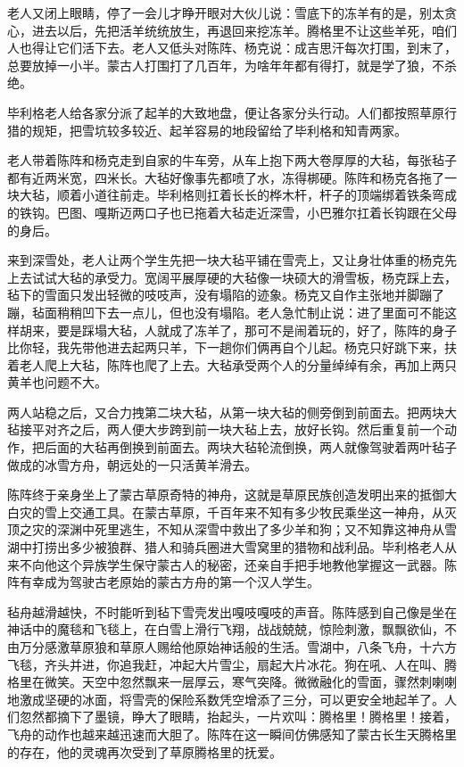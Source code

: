 \par 老人又闭上眼睛，停了一会儿才睁开眼对大伙儿说：雪底下的冻羊有的是，别太贪心，进去以后，先把活羊统统放生，再退回来挖冻羊。腾格里不让这些羊死，咱们人也得让它们活下去。老人又低头对陈阵、杨克说：成吉思汗每次打围，到末了，总要放掉一小半。蒙古人打围打了几百年，为啥年年都有得打，就是学了狼，不杀绝。
\par 毕利格老人给各家分派了起羊的大致地盘，便让各家分头行动。人们都按照草原行猎的规矩，把雪坑较多较近、起羊容易的地段留给了毕利格和知青两家。
\par 老人带着陈阵和杨克走到自家的牛车旁，从车上抱下两大卷厚厚的大毡，每张毡子都有近两米宽，四米长。大毡好像事先都喷了水，冻得梆硬。陈阵和杨克各拖了一块大毡，顺着小道往前走。毕利格则扛着长长的桦木杆，杆子的顶端绑着铁条弯成的铁钩。巴图、嘎斯迈两口子也已拖着大毡走近深雪，小巴雅尔扛着长钩跟在父母的身后。
\par 来到深雪处，老人让两个学生先把一块大毡平铺在雪壳上，又让身壮体重的杨克先上去试试大毡的承受力。宽阔平展厚硬的大毡像一块硕大的滑雪板，杨克踩上去，毡下的雪面只发出轻微的吱吱声，没有塌陷的迹象。杨克又自作主张地并脚蹦了蹦，毡面稍稍凹下去一点儿，但也没有塌陷。老人急忙制止说：进了里面可不能这样胡来，要是踩塌大毡，人就成了冻羊了，那可不是闹着玩的，好了，陈阵的身子比你轻，我先带他进去起两只羊，下一趟你们俩再自个儿起。杨克只好跳下来，扶着老人爬上大毡，陈阵也爬了上去。大毡承受两个人的分量绰绰有余，再加上两只黄羊也问题不大。
\par 两人站稳之后，又合力拽第二块大毡，从第一块大毡的侧旁倒到前面去。把两块大毡接平对齐之后，两人便大步跨到前一块大毡上去，放好长钩。然后重复前一个动作，把后面的大毡再倒换到前面去。两块大毡轮流倒换，两人就像驾驶着两叶毡子做成的冰雪方舟，朝远处的一只活黄羊滑去。
\par 陈阵终于亲身坐上了蒙古草原奇特的神舟，这就是草原民族创造发明出来的抵御大白灾的雪上交通工具。在蒙古草原，千百年来不知有多少牧民乘坐这一神舟，从灭顶之灾的深渊中死里逃生，不知从深雪中救出了多少羊和狗；又不知靠这神舟从雪湖中打捞出多少被狼群、猎人和骑兵圈进大雪窝里的猎物和战利品。毕利格老人从来不向他这个异族学生保守蒙古人的秘密，还亲自手把手地教他掌握这一武器。陈阵有幸成为驾驶古老原始的蒙古方舟的第一个汉人学生。
\par 毡舟越滑越快，不时能听到毡下雪壳发出嘎吱嘎吱的声音。陈阵感到自己像是坐在神话中的魔毯和飞毯上，在白雪上滑行飞翔，战战兢兢，惊险刺激，飘飘欲仙，不由万分感激草原狼和草原人赐给他原始神话般的生活。雪湖中，八条飞舟，十六方飞毯，齐头并进，你追我赶，冲起大片雪尘，扇起大片冰花。狗在吼、人在叫、腾格里在微笑。天空中忽然飘来一层厚云，寒气突降。微微融化的雪面，骤然刺喇喇地激成坚硬的冰面，将雪壳的保险系数凭空增添了三分，可以更安全地起羊了。人们忽然都摘下了墨镜，睁大了眼睛，抬起头，一片欢叫：腾格里！腾格里！接着，飞舟的动作也越来越迅速而大胆了。陈阵在这一瞬间仿佛感知了蒙古长生天腾格里的存在，他的灵魂再次受到了草原腾格里的抚爱。
